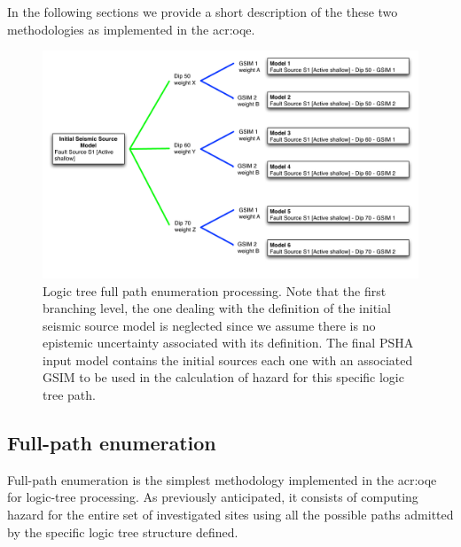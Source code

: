In the following sections we provide a short description of 
the these two methodologies as implemented in the \gls{acr:oqe}.
%
\begin{figure}[ht]
\centering
\includegraphics[width=\textwidth]{./Pictures/lts/logic_tree_ex1.pdf}
\caption{Logic tree full path enumeration processing. Note that the
first branching level, the one dealing with the definition of the initial 
seismic source model is neglected since we assume there is no epistemic
uncertainty associated with its definition. The final PSHA input model 
contains the initial sources each one with an associated GSIM to be used 
in the calculation of hazard for this specific logic tree path.}
\label{fig:logic_tree_example1}
\end{figure}
%
\subsection{Full-path enumeration}
Full-path enumeration is the simplest methodology implemented in the
\gls{acr:oqe} for logic-tree processing. 
%
As previously anticipated, it consists of computing hazard 
for the entire set of investigated sites using all the possible paths 
admitted by the specific logic tree structure defined.

